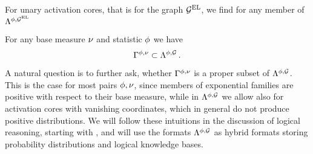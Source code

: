 For unary activation cores, that is for the graph $\mathcal{G}^{\mathrm{EL}}$, we find for any member of $\Lambda^{\phi,\mathcal{G}^{\mathrm{EL}}} $
\begin{center}
    
\end{center}


\begin{corollary}
    For any base measure $\nu$ and statistic $\phi$ we have
    \[ \Gamma^{\phi,\nu} \subset \Lambda^{\phi,\mathcal{G}} \, . \]
\end{corollary}

A natural question is to further ask, whether $\Gamma^{\phi,\nu}$ is a proper subset of $\Lambda^{\phi,\mathcal{G}}$.
This is the case for most pairs $\phi,\nu$, since members of exponential families are positive with respect to their base measure, while in $\Lambda^{\phi,\mathcal{G}}$ we allow also for activation cores with vanishing coordinates, which in general do not produce positive distributions.
We will follow these intuitions in the discussion of logical reasoning, starting with , and will use the formats $\Lambda^{\phi,\mathcal{G}}$ as hybrid formats storing probability distributions and logical knowledge bases.

%
%	


